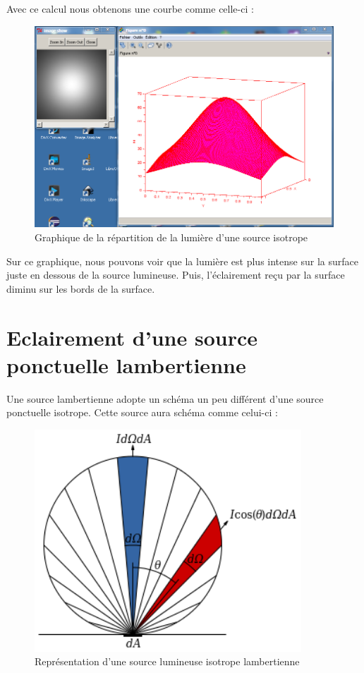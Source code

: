 \documentclass{article}
\begin{document}
  Avec ce calcul nous obtenons une courbe comme celle-ci :
  
  \begin{center}
    \begin{figure}[!h]
      \includegraphics[width=15cm]{../isotrope.PNG}
      \caption{Graphique de la répartition de la lumière d'une source isotrope}
    \end{figure}
  \end{center}
  
  Sur ce graphique, nous pouvons voir que la lumière est plus intense sur la surface juste
  en dessous de la source lumineuse. Puis, l'éclairement reçu par la surface diminu sur les 
  bords de la surface.

  \section{Eclairement d'une source ponctuelle lambertienne}
  Une source lambertienne adopte un schéma un peu différent d'une source ponctuelle isotrope.
  Cette source aura schéma comme celui-ci :
  
  \begin{figure}[!h]
    \begin{center}
      \includegraphics[width=10cm]{../Lambert_Cosine_Law_1.png}
      \caption{Représentation d'une source lumineuse isotrope lambertienne}
    \end{center}
  \end{figure}
  
\end{document}
